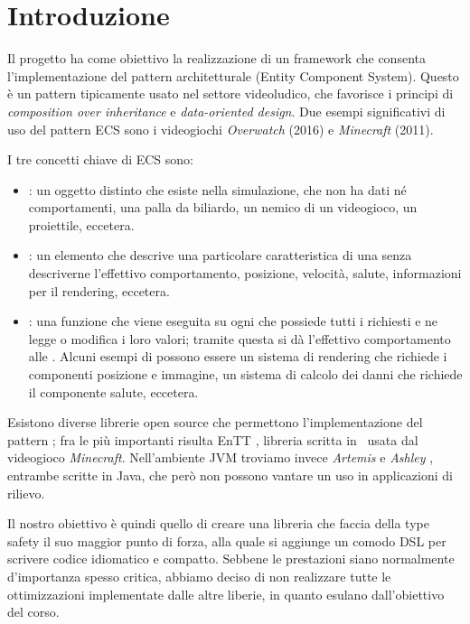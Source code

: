 \chapter*{Introduzione}
Il progetto ha come obiettivo la realizzazione di un framework che consenta l'implementazione del pattern
architetturale \ECS (Entity Component System).
Questo è un pattern tipicamente usato nel settore videoludico, che favorisce i principi di
\textit{composition over inheritance} e \textit{data-oriented design}.
Due esempi significativi di uso del pattern ECS sono i videogiochi \textit{Overwatch} (2016) e \textit{Minecraft}
(2011).

I tre concetti chiave di ECS sono:
\begin{itemize}
    \item \Entity: un oggetto distinto che esiste nella simulazione, che non ha dati né comportamenti,
    \eg una palla da biliardo, un nemico di un videogioco, un proiettile, eccetera.
    \item \Component: un elemento che descrive una particolare caratteristica di una \Entity senza descriverne
    l'effettivo comportamento, \eg posizione, velocità, salute, informazioni per il rendering, eccetera.
    \item \System: una funzione che viene eseguita su ogni \Entity che possiede tutti i \Component richiesti e ne
    legge o modifica i loro valori;
    tramite questa si dà l'effettivo comportamento alle \Entity.
    Alcuni esempi di \System possono essere un sistema di rendering che richiede i componenti posizione e immagine,
    un sistema di calcolo dei danni che richiede il componente salute, eccetera.
\end{itemize}

Esistono diverse librerie open source che permettono l'implementazione del pattern \ECS; fra le più importanti risulta
EnTT \cite{entt}, libreria scritta in \CC\ usata dal videogioco \textit{Minecraft}.
Nell'ambiente JVM troviamo invece \textit{Artemis} \cite{artemis} e \textit{Ashley} \cite{ashley}, entrambe scritte in
Java, che però non possono vantare un uso in applicazioni di rilievo.

Il nostro obiettivo è quindi quello di creare una libreria che faccia della type safety il suo maggior punto di forza,
alla quale si aggiunge un comodo DSL per scrivere codice idiomatico e compatto.
Sebbene le prestazioni siano normalmente d'importanza spesso critica, abbiamo deciso di non realizzare tutte le
ottimizzazioni implementate dalle altre liberie, in quanto esulano dall'obiettivo del corso.